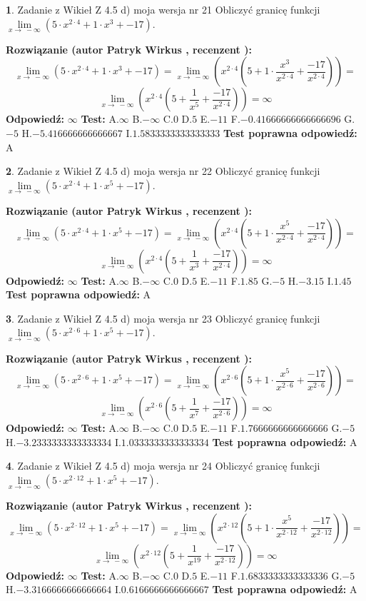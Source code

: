 \documentclass[12pt, a4paper]{article}
\theoremstyle{definition} %
\newtheorem{zad}{}
\newcommand{\zadStart}[1]{\begin{zad}#1\newline}
\newcommand{\zadStop}{\end{zad}}
\newcommand{\rozwStart}[2]{\noindent \textbf{Rozwiązanie (autor #1 , recenzent #2): }\newline}
\newcommand{\rozwStop}{\newline}
\newcommand{\odpStart}{\noindent \textbf{Odpowiedź:}\newline}
\newcommand{\odpStop}{\newline}
\newcommand{\testStart}{\noindent \textbf{Test:}\newline}
\newcommand{\testStop}{\newline}
\newcommand{\kluczStart}{\noindent \textbf{Test poprawna odpowiedź:}\newline}
\newcommand{\kluczStop}{\newline}
\begin{document}
\zadStart{Zadanie z Wikieł Z 4.5 d) moja wersja nr 21}
Obliczyć granicę funkcji  $\lim\limits_{x\to\ -\infty}(5 \cdot x^{2\cdot4}+1 \cdot x^{3}+-17)$.
\zadStop
\rozwStart{Patryk Wirkus}{}
$$\lim\limits_{x\to\ -\infty}(5 \cdot x^{2\cdot4}+1 \cdot x^{3}+-17) = \lim\limits_{x\to\ -\infty}(x^{2\cdot4}(5 +1 \cdot \frac{x^{3}}{x^{2\cdot4}}+\frac{-17}{x^{2\cdot4}})) =$$ $$\lim\limits_{x\to\ -\infty}(x^{2\cdot4}(5 +\frac{1}{x^{5}}+\frac{-17}{x^{2\cdot4}})) =\infty$$
\rozwStop
\odpStart
$\infty$
\odpStop
\testStart
A.$\infty$ B.$-\infty$ C.$0$ D.$5$ E.$-11$
F.$-0.41666666666666696$ G.$-5$
H.$-5.416666666666667$
I.$1.5833333333333333$
\testStop
\kluczStart
A
\kluczStop



\zadStart{Zadanie z Wikieł Z 4.5 d) moja wersja nr 22}
Obliczyć granicę funkcji  $\lim\limits_{x\to\ -\infty}(5 \cdot x^{2\cdot4}+1 \cdot x^{5}+-17)$.
\zadStop
\rozwStart{Patryk Wirkus}{}
$$\lim\limits_{x\to\ -\infty}(5 \cdot x^{2\cdot4}+1 \cdot x^{5}+-17) = \lim\limits_{x\to\ -\infty}(x^{2\cdot4}(5 +1 \cdot \frac{x^{5}}{x^{2\cdot4}}+\frac{-17}{x^{2\cdot4}})) =$$ $$\lim\limits_{x\to\ -\infty}(x^{2\cdot4}(5 +\frac{1}{x^{3}}+\frac{-17}{x^{2\cdot4}})) =\infty$$
\rozwStop
\odpStart
$\infty$
\odpStop
\testStart
A.$\infty$ B.$-\infty$ C.$0$ D.$5$ E.$-11$
F.$1.85$ G.$-5$
H.$-3.15$
I.$1.45$
\testStop
\kluczStart
A
\kluczStop



\zadStart{Zadanie z Wikieł Z 4.5 d) moja wersja nr 23}
Obliczyć granicę funkcji  $\lim\limits_{x\to\ -\infty}(5 \cdot x^{2\cdot6}+1 \cdot x^{5}+-17)$.
\zadStop
\rozwStart{Patryk Wirkus}{}
$$\lim\limits_{x\to\ -\infty}(5 \cdot x^{2\cdot6}+1 \cdot x^{5}+-17) = \lim\limits_{x\to\ -\infty}(x^{2\cdot6}(5 +1 \cdot \frac{x^{5}}{x^{2\cdot6}}+\frac{-17}{x^{2\cdot6}})) =$$ $$\lim\limits_{x\to\ -\infty}(x^{2\cdot6}(5 +\frac{1}{x^{7}}+\frac{-17}{x^{2\cdot6}})) =\infty$$
\rozwStop
\odpStart
$\infty$
\odpStop
\testStart
A.$\infty$ B.$-\infty$ C.$0$ D.$5$ E.$-11$
F.$1.7666666666666666$ G.$-5$
H.$-3.2333333333333334$
I.$1.0333333333333334$
\testStop
\kluczStart
A
\kluczStop



\zadStart{Zadanie z Wikieł Z 4.5 d) moja wersja nr 24}
Obliczyć granicę funkcji  $\lim\limits_{x\to\ -\infty}(5 \cdot x^{2\cdot12}+1 \cdot x^{5}+-17)$.
\zadStop
\rozwStart{Patryk Wirkus}{}
$$\lim\limits_{x\to\ -\infty}(5 \cdot x^{2\cdot12}+1 \cdot x^{5}+-17) = \lim\limits_{x\to\ -\infty}(x^{2\cdot12}(5 +1 \cdot \frac{x^{5}}{x^{2\cdot12}}+\frac{-17}{x^{2\cdot12}})) =$$ $$\lim\limits_{x\to\ -\infty}(x^{2\cdot12}(5 +\frac{1}{x^{19}}+\frac{-17}{x^{2\cdot12}})) =\infty$$
\rozwStop
\odpStart
$\infty$
\odpStop
\testStart
A.$\infty$ B.$-\infty$ C.$0$ D.$5$ E.$-11$
F.$1.6833333333333336$ G.$-5$
H.$-3.3166666666666664$
I.$0.6166666666666667$
\testStop
\kluczStart
A
\kluczStop
\end{document}
